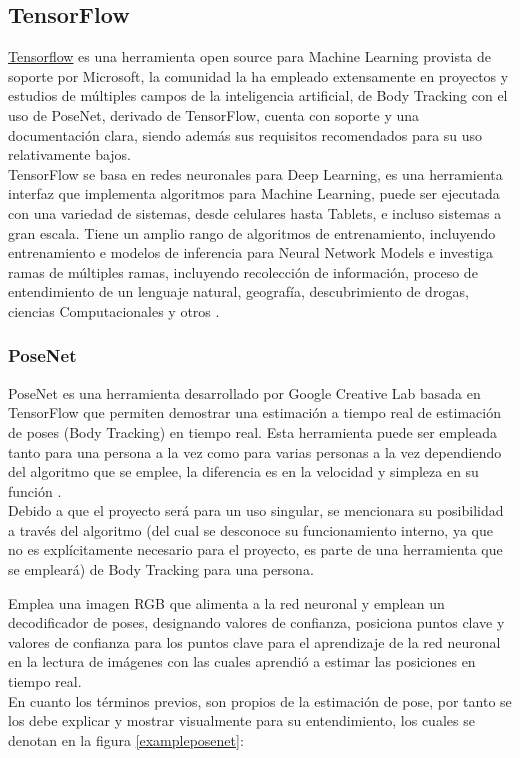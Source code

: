 \subsection{TensorFlow}

\href{https://www.tensorflow.org/lite/models/pose\_estimation/overview}{Tensorflow} es una herramienta open source para Machine Learning provista de soporte por Microsoft, la comunidad la ha empleado extensamente en proyectos y estudios de múltiples campos de la inteligencia artificial, de Body Tracking con el uso de PoseNet, derivado de TensorFlow, cuenta con soporte y una documentación clara, siendo además sus requisitos recomendados para su uso relativamente bajos. 
\\
TensorFlow se basa en redes neuronales para Deep Learning, es una herramienta interfaz que implementa algoritmos para Machine Learning, puede ser ejecutada con una variedad de sistemas, desde celulares hasta Tablets, e incluso sistemas a gran escala. Tiene un amplio rango de algoritmos de entrenamiento, incluyendo entrenamiento e modelos de inferencia para Neural Network Models e investiga ramas de múltiples ramas, incluyendo recolección de información, proceso de entendimiento de un lenguaje natural, geografía, descubrimiento de drogas, ciencias Computacionales y otros \cite{abadi2016tensorflow}.

\subsubsection{PoseNet}

PoseNet es una herramienta desarrollado por Google Creative Lab basada en TensorFlow que permiten demostrar una estimación a tiempo real de estimación de poses (Body Tracking) en tiempo real. Esta herramienta puede ser empleada tanto para una persona a la vez como para varias personas a la vez dependiendo del algoritmo que se emplee, la diferencia es en la velocidad y simpleza en su función \cite{kendall2015posenet}.
\\
Debido a que el proyecto será para un uso singular, se mencionara su posibilidad a través del algoritmo (del cual se desconoce su funcionamiento interno, ya que no es explícitamente necesario para el proyecto, es parte de una herramienta que se empleará) de Body Tracking para una persona.

Emplea una imagen RGB que alimenta a la red neuronal y emplean un decodificador de poses, designando valores de confianza, posiciona puntos clave y valores de confianza para los puntos clave para el aprendizaje de la red neuronal en la lectura de imágenes con las cuales aprendió a estimar las posiciones en tiempo real\cite{oved2018real}.
\\
En cuanto los términos previos, son propios de la estimación de pose, por tanto se los debe explicar y mostrar visualmente para su entendimiento, los cuales se denotan en la figura \ref{exampleposenet}:

